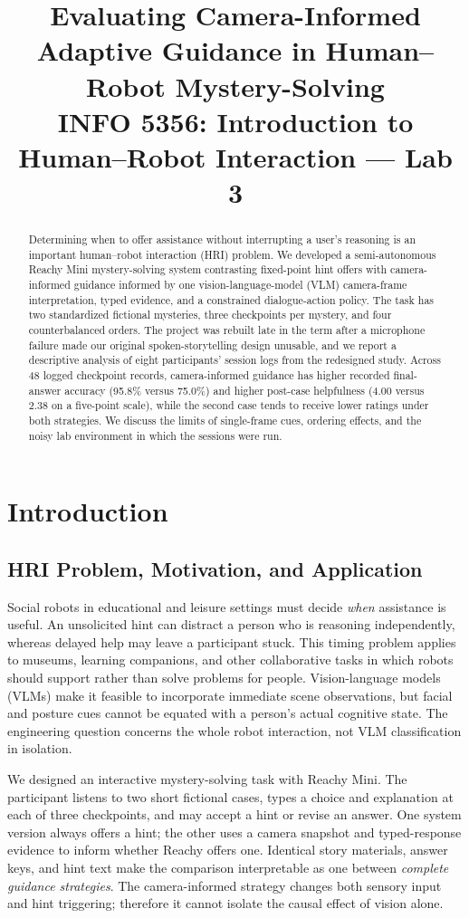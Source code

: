 \documentclass[conference]{IEEEtran}
\title{Evaluating Camera-Informed Adaptive Guidance in Human--Robot Mystery-Solving\\[0.35em]\large INFO 5356: Introduction to Human--Robot Interaction --- Lab 3}
\author{\IEEEauthorblockN{Fanning Yifan Luo, Aurora Jiaxin Shen, Elliot Zhang, Jaclyn Pham}\IEEEauthorblockA{Cornell Tech\\NetIDs: yl4389, js3996, qz432, cqp4}}
\begin{document}
\maketitle
\begin{abstract}
Determining when to offer assistance without interrupting a user's reasoning is an important human--robot interaction (HRI) problem. We developed a semi-autonomous Reachy Mini mystery-solving system contrasting fixed-point hint offers with camera-informed guidance informed by one vision-language-model (VLM) camera-frame interpretation, typed evidence, and a constrained dialogue-action policy. The task has two standardized fictional mysteries, three checkpoints per mystery, and four counterbalanced orders. The project was rebuilt late in the term after a microphone failure made our original spoken-storytelling design unusable, and we report a descriptive analysis of eight participants' session logs from the redesigned study. Across 48 logged checkpoint records, camera-informed guidance has higher recorded final-answer accuracy (95.8\% versus 75.0\%) and higher post-case helpfulness (4.00 versus 2.38 on a five-point scale), while the second case tends to receive lower ratings under both strategies. We discuss the limits of single-frame cues, ordering effects, and the noisy lab environment in which the sessions were run.
\end{abstract}

\section{Introduction}
\subsection{HRI Problem, Motivation, and Application}
Social robots in educational and leisure settings must decide \emph{when} assistance is useful. An unsolicited hint can distract a person who is reasoning independently, whereas delayed help may leave a participant stuck. This timing problem applies to museums, learning companions, and other collaborative tasks in which robots should support rather than solve problems for people. Vision-language models (VLMs) make it feasible to incorporate immediate scene observations, but facial and posture cues cannot be equated with a person's actual cognitive state. The engineering question concerns the whole robot interaction, not VLM classification in isolation.

We designed an interactive mystery-solving task with Reachy Mini. The participant listens to two short fictional cases, types a choice and explanation at each of three checkpoints, and may accept a hint or revise an answer. One system version always offers a hint; the other uses a camera snapshot and typed-response evidence to inform whether Reachy offers one. Identical story materials, answer keys, and hint text make the comparison interpretable as one between \emph{complete guidance strategies}. The camera-informed strategy changes both sensory input and hint triggering; therefore it cannot isolate the causal effect of vision alone.
\end{document}
